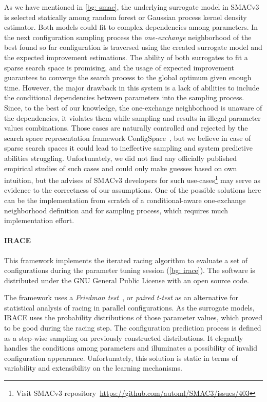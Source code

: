 As we have mentioned in \cref{bg: smac}, the underlying surrogate model in SMACv3 is selected statically among random forest or Gaussian process kernel density estimator. Both models could fit to complex dependencies among parameters. In the next configuration sampling process the \emph{one-exchange} neighborhood of the best found so far configuration is traversed using the created surrogate model and the expected improvement estimations. The ability of both surrogates to fit a sparse search space is promising, and the usage of expected improvement guarantees to converge the search process to the global optimum given enough time. However, the major drawback in this system is a lack of abilities to include the conditional dependencies between parameters into the sampling process. Since, to the best of our knowledge, the one-exchange neighborhood is unaware of the dependencies, it violates them while sampling and results in illegal parameter values combinations. Those cases are naturally controlled and rejected by the search space representation framework ConfigSpace~\cite{configspace}, but we believe in case of sparse search spaces it could lead to ineffective sampling and system predictive abilities struggling. Unfortunately, we did not find any officially published empirical studies of such cases and could only make guesses based on own intuition, but the advises of SMACv3 developers for such use-cases\footnote{Visit SMACv3 repository~\url{https://github.com/automl/SMAC3/issues/403}} may serve as evidence to the correctness of our assumptions. One of the possible solutions here can be the implementation from scratch of a conditional-aware one-exchange neighborhood definition and for sampling process, which requires much implementation effort.

\paragraph{IRACE} This framework implements the iterated racing algorithm to evaluate a set of configurations during the parameter tuning session (\cref{bg: irace}). The software is distributed under the GNU General Public License with an open source code.

The framework uses a \emph{Friedman test}~\cite{conover1980practical}, or \emph{paired t-test} as an alternative for statistical analysis of racing in parallel configurations. As the surrogate models, IRACE uses the probability distributions of those parameter values, which proved to be good during the racing step. The configuration prediction process is defined as a step-wise sampling on previously constructed distributions. It elegantly handles the conditions among parameters and illuminates a possibility of invalid configuration appearance. Unfortunately, this solution is static in terms of variability and extensibility on the learning mechanisms.

